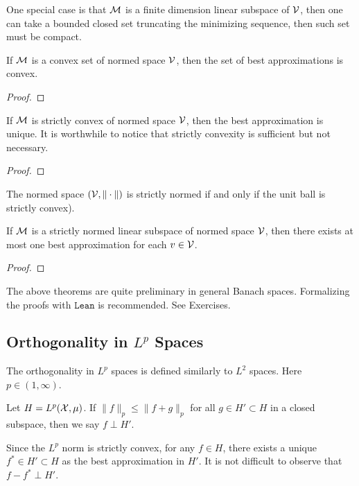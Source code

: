 One special case is that $\mathcal M$ is a finite dimension linear subspace of $\mathcal V$, then one can take a bounded closed set truncating the minimizing sequence, then such set must be compact.
\begin{lemma}[convexity]
\label{Lem: 4-CON}
If $\mathcal M$ is a convex set of normed space $\mathcal V$, then the set of best approximations is convex.
\end{lemma}
\begin{proof}
    
\end{proof}
\begin{theorem}[uniqueness]
\label{Thm: 4-Uni-1}
    If $\mathcal M$ is strictly convex of normed space $\mathcal V$, then the best approximation is unique. It is worthwhile to notice that strictly convexity is sufficient but not necessary.
\end{theorem}
\begin{proof}
    
\end{proof}
\begin{definition}
   The normed space $(\mathcal V, \|\cdot\|)$ is strictly normed if and only if the unit ball is strictly convex).
\end{definition}
\begin{theorem}[uniqueness]
\label{Thm: 4-Uni-2}
    If $\mathcal M$ is a strictly normed linear subspace of normed space $\mathcal V$, then there exists at most one best approximation for each $v\in\mathcal V$.
\end{theorem}
\begin{proof}
    
\end{proof}

\begin{remark}
    The above theorems are quite preliminary in general Banach spaces. Formalizing the proofs with $\texttt{Lean}$ is recommended. See Exercises.  
\end{remark}
\subsection{Orthogonality in \texorpdfstring{$L^p$} - Spaces}
The orthogonality in $L^p$ spaces is defined similarly to $L^2$ spaces. Here $p\in(1,\infty)$.
\begin{definition}
    Let $H = L^p(\mathcal X, \mu)$. If $\|f\|_p\le \|f + g\|_p$ for all $g\in H'\subset H$ in a closed subspace, then we say $f\perp H'$. 
\end{definition}
Since the $L^p$ norm is strictly convex, for any $f\in H$, there exists a unique $f^{\ast}\in H'\subset H$ as the best approximation in $H'$. It is not difficult to observe that $f-f^{\ast}\perp H'$. 

